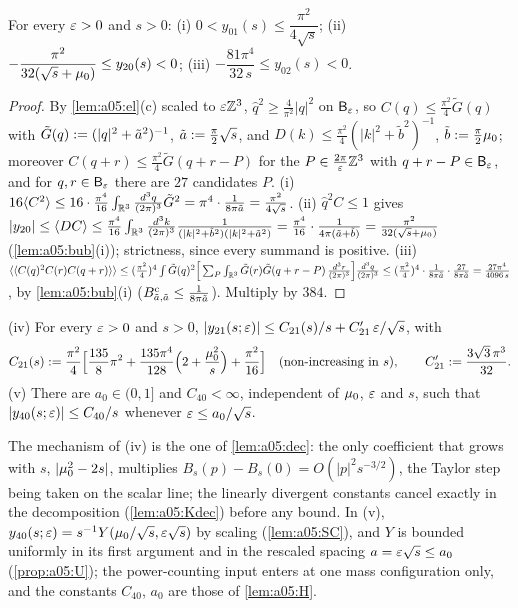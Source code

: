 \begin{lemma}\label{lem:a05:D123}
For every $\varepsilon>0$ and $s>0$:
\textup{(i)} $0<y_{01}(s)\le\dfrac{\pi^2}{4\sqrt s}$;
\textup{(ii)} $-\dfrac{\pi^2}{32(\sqrt s+\mu_0)}\le y_{20}(s)<0$;
\textup{(iii)} $-\dfrac{81\pi^4}{32\,s}\le y_{02}(s)<0$.
\end{lemma}
\begin{proof}
By \cref{lem:a05:el}(c) scaled to $\varepsilon\mathbb Z^3$, $\hat q^2\ge\frac4{\pi^2}|q|^2$ on $\mathsf B_{\varepsilon}$, so $C(q)\le\frac{\pi^2}4\tilde G(q)$ with $\tilde G(q):=(|q|^2+\tilde a^2)^{-1}$, $\tilde a:=\frac\pi2\sqrt s$, and $D(k)\le\frac{\pi^2}4(|k|^2+\tilde b^2)^{-1}$, $\tilde b:=\frac\pi2\mu_0$; moreover $C(q+r)\le\frac{\pi^2}4\tilde G(q+r-P)$ for the $P\in\frac{2\pi}{\varepsilon}\mathbb Z^3$ with $q+r-P\in\mathsf B_{\varepsilon}$, and for $q,r\in\mathsf B_{\varepsilon}$ there are $27$ candidates $P$.
(i) $16\langle C^2\rangle\le16\cdot\frac{\pi^4}{16}\int_{\mathbb R^3}\frac{d^3q}{(2\pi)^3}\tilde G^2=\pi^4\cdot\frac1{8\pi\tilde a}=\frac{\pi^2}{4\sqrt s}$.
(ii) $\hat q^2C\le1$ gives $|y_{20}|\le\langle DC\rangle\le\frac{\pi^4}{16}\int_{\mathbb R^3}\frac{d^3k}{(2\pi)^3}\frac1{(|k|^2+\tilde b^2)(|k|^2+\tilde a^2)}=\frac{\pi^4}{16}\cdot\frac1{4\pi(\tilde a+\tilde b)}=\frac{\pi^2}{32(\sqrt s+\mu_0)}$ (\cref{lem:a05:bub}(i)); strictness, since every summand is positive.
(iii) $\langle\langle C(q)^2C(r)C(q+r)\rangle\rangle\le(\frac{\pi^2}4)^4\int\tilde G(q)^2\Big[\sum_P\int_{\mathbb R^3}\tilde G(r)\tilde G(q+r-P)\,\frac{d^3r}{(2\pi)^3}\Big]\frac{d^3q}{(2\pi)^3}\le(\frac{\pi^2}4)^4\cdot\frac1{8\pi\tilde a}\cdot\frac{27}{8\pi\tilde a}=\frac{27\pi^4}{4096\,s}$, by \cref{lem:a05:bub}(i) ($B^{\mathrm c}_{\tilde a,\tilde a}\le\frac1{8\pi\tilde a}$). Multiply by $384$.
\end{proof}

\begin{lemma}\label{lem:a05:D45}
\textup{(iv)} For every $\varepsilon>0$ and $s>0$, $|y_{21}(s;\varepsilon)|\le C_{21}(s)/s+C'_{21}\,\varepsilon/\sqrt s$, with
\[
C_{21}(s):=\frac{\pi^2}4\Big[\frac{135}8\pi^2+\frac{135\pi^4}{128}\Big(2+\frac{\mu_0^2}s\Big)+\frac{\pi^2}{16}\Big]\quad(\text{non-increasing in }s),\qquad C'_{21}:=\frac{3\sqrt3\,\pi^3}{32}.
\]
\textup{(v)} There are $a_0\in(0,1]$ and $C_{40}<\infty$, independent of $\mu_0$, $\varepsilon$ and $s$, such that $|y_{40}(s;\varepsilon)|\le C_{40}/s$ whenever $\varepsilon\le a_0/\sqrt s$.
\end{lemma}



The mechanism of (iv) is the one of \cref{lem:a05:dec}: the only coefficient that grows with $s$, $|\mu_0^2-2s|$, multiplies $B_s(p)-B_s(0)=O(|p|^2s^{-3/2})$, the Taylor step being taken on the scalar line; the linearly divergent constants cancel exactly in the decomposition (\cref{lem:a05:Kdec}) before any bound. In (v), $y_{40}(s;\varepsilon)=s^{-1}Y(\mu_0/\sqrt s,\varepsilon\sqrt s)$ by scaling (\cref{lem:a05:SC}), and $Y$ is bounded uniformly in its first argument and in the rescaled spacing $a=\varepsilon\sqrt s\le a_0$ (\cref{prop:a05:U}); the power-counting input enters at one mass configuration only, and the constants $C_{40}$, $a_0$ are those of \cref{lem:a05:H}.

